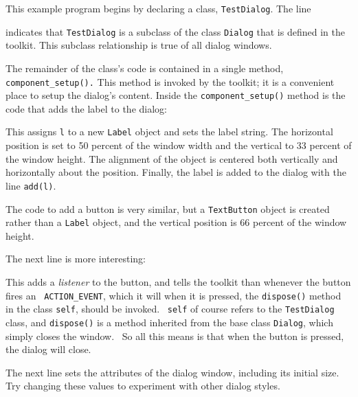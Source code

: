\bigskip

This example program begins by
declaring a class, \texttt{TestDialog}. The line


\noindent
indicates that \texttt{TestDialog} is a subclass of the
class \texttt{Dialog} that is defined in the toolkit. This subclass
relationship is true of all dialog windows. 

The remainder of the class's code is contained in a single method,
\texttt{component\_setup().} This method is invoked by the toolkit; it
is a convenient place to setup the dialog's content.
Inside the \texttt{component\_setup()} method is the code that adds
the label to the dialog:


\noindent This assigns \texttt{l} to a new \texttt{Label} object
and sets the label string. The horizontal position is set to 50 percent of
the window width and the vertical to 33 percent of the window height.
The alignment of the object is centered both vertically and
horizontally about the position. Finally, the label is added to the
dialog with the line \texttt{add(l)}.

The code to add a button is very similar, but a \texttt{TextButton}
object is created rather than a \texttt{Label} object, and the vertical
position is 66 percent of the window height. 

The next line is more interesting:


\noindent This adds a \textit{listener} to the button, and tells the toolkit
than whenever the button fires an \ \texttt{ACTION\_EVENT}, which it will
when it is pressed, the \texttt{dispose()} method in the class
\texttt{self}, should be invoked. \ \texttt{self} of course refers to
the \texttt{TestDialog} class, and \texttt{dispose()} is a method
inherited from the base class \texttt{Dialog}, which simply closes the
window. \ So all this means is that when the button is pressed, the
dialog will close.

The next line sets the attributes of the dialog window, including its
initial size. Try changing these values to experiment with other dialog
styles.


